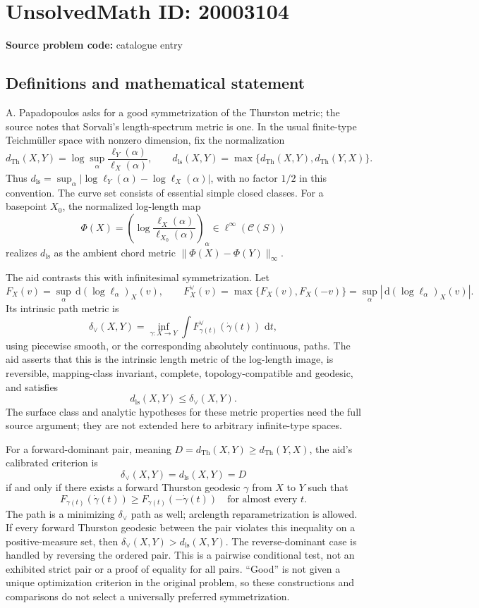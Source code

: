 \documentclass[11pt]{article}
\newcommand{\dd}{\,\mathrm{d}}
\begin{document}
\section*{UnsolvedMath ID: 20003104}
\textbf{Source problem code:} catalogue entry
\subsection{Definitions and mathematical statement}
A. Papadopoulos asks for a good symmetrization of the Thurston metric; the source notes that Sorvali's length-spectrum metric is one. In the usual finite-type Teichm\"uller space with nonzero dimension, fix the normalization
\[
d_{\mathrm{Th}}(X,Y)=\log\sup_{\alpha}\frac{\ell_Y(\alpha)}{\ell_X(\alpha)},\qquad
d_{\mathrm{ls}}(X,Y)=\max\{d_{\mathrm{Th}}(X,Y),d_{\mathrm{Th}}(Y,X)\}.
\]
Thus $d_{\mathrm{ls}}=\sup_\alpha|\log\ell_Y(\alpha)-\log\ell_X(\alpha)|$, with no factor $1/2$ in this convention. The curve set consists of essential simple closed classes. For a basepoint $X_0$, the normalized log-length map
\[
\Phi(X)=\left(\log\frac{\ell_X(\alpha)}{\ell_{X_0}(\alpha)}\right)_\alpha\in\ell^\infty(\mathcal C(S))
\]
realizes $d_{\mathrm{ls}}$ as the ambient chord metric $\|\Phi(X)-\Phi(Y)\|_\infty$.

The aid contrasts this with infinitesimal symmetrization. Let
\[
F_X(v)=\sup_\alpha\dd(\log\ell_\alpha)_X(v),\qquad
F_X^\vee(v)=\max\{F_X(v),F_X(-v)\}
=\sup_\alpha|\dd(\log\ell_\alpha)_X(v)|.
\]
Its intrinsic path metric is
\[
\delta_\vee(X,Y)=\inf_{\gamma:X\to Y}\int F_{\gamma(t)}^\vee(\dot\gamma(t))\,\dd t,
\]
using piecewise smooth, or the corresponding absolutely continuous, paths. The aid asserts that this is the intrinsic length metric of the log-length image, is reversible, mapping-class invariant, complete, topology-compatible and geodesic, and satisfies
\[
d_{\mathrm{ls}}(X,Y)\leq\delta_\vee(X,Y).
\]
The surface class and analytic hypotheses for these metric properties need the full source argument; they are not extended here to arbitrary infinite-type spaces.

For a forward-dominant pair, meaning $D=d_{\mathrm{Th}}(X,Y)\geq d_{\mathrm{Th}}(Y,X)$, the aid's calibrated criterion is
\[
\delta_\vee(X,Y)=d_{\mathrm{ls}}(X,Y)=D
\]
if and only if there exists a forward Thurston geodesic $\gamma$ from $X$ to $Y$ such that
\[
F_{\gamma(t)}(\dot\gamma(t))\geq F_{\gamma(t)}(-\dot\gamma(t))
\quad\text{for almost every }t.
\]
The path is a minimizing $\delta_\vee$ path as well; arclength reparametrization is allowed. If every forward Thurston geodesic between the pair violates this inequality on a positive-measure set, then $\delta_\vee(X,Y)>d_{\mathrm{ls}}(X,Y)$. The reverse-dominant case is handled by reversing the ordered pair. This is a pairwise conditional test, not an exhibited strict pair or a proof of equality for all pairs. ``Good'' is not given a unique optimization criterion in the original problem, so these constructions and comparisons do not select a universally preferred symmetrization.
\end{document}

